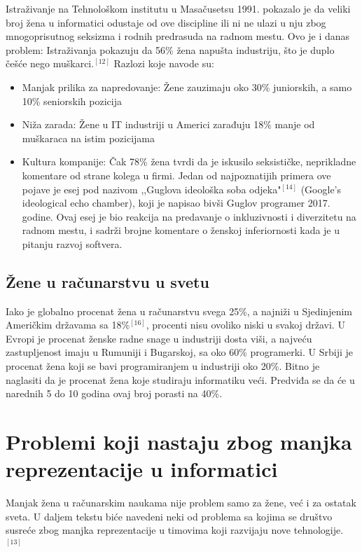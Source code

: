 \documentclass[12pt]{article}
\begin{document}
Istraživanje na Tehnološkom institutu u Masačusetsu 1991. pokazalo je da veliki broj žena u informatici odustaje od ove discipline ili ni ne ulazi u nju zbog mnogoprisutnog seksizma i rodnih predrasuda na radnom mestu. Ovo je i danas problem: Istraživanja pokazuju da 56\% žena napušta industriju, što je duplo češće nego muškarci.$^{[12]}$ Razlozi koje navode su: 

\begin{itemize}
    \item Manjak prilika za napredovanje: Žene zauzimaju oko 30\% juniorskih, a samo 10\% seniorskih pozicija
    \item Niža zarada: Žene u IT industriji u Americi zarađuju 18\% manje od muškaraca na istim pozicijama
    \item Kultura kompanije: Čak 78\% žena tvrdi da je iskusilo seksističke, neprikladne komentare od strane kolega u firmi. Jedan od najpoznatijih primera ove pojave je esej pod nazivom ,,Guglova ideološka soba odjeka"$^{[14]}$ (Google's ideological echo chamber), koji je napisao bivši Guglov programer 2017. godine. Ovaj esej je bio reakcija na predavanje o inkluzivnosti i diverzitetu na radnom mestu, i sadrži brojne komentare o ženskoj inferiornosti kada je u pitanju razvoj softvera. 
\end{itemize}

\subsection{Žene u računarstvu u svetu}

Iako je globalno procenat žena u računarstvu svega 25\%, a najniži u Sjedinjenim Američkim državama sa 18\%$^{[16]}$, procenti nisu ovoliko niski u svakoj državi. U Evropi je procenat ženske radne snage u industriji dosta viši, a najveću zastupljenost imaju u Rumuniji i Bugarskoj, sa oko 60\% programerki. U Srbiji je procenat žena koji se bavi programiranjem u industriji oko 20\%. Bitno je naglasiti da je procenat žena koje studiraju informatiku veći. Predviđa se da će u narednih 5 do 10 godina ovaj broj porasti na 40\%.

\newpage

\section{Problemi koji nastaju zbog manjka reprezentacije u informatici}

Manjak žena u računarskim naukama nije problem samo za žene, već i za ostatak sveta. U daljem tekstu biće navedeni neki od problema sa kojima se društvo susreće zbog manjka reprezentacije u timovima koji razvijaju nove tehnologije.$^{[13]}$
\end{document}
